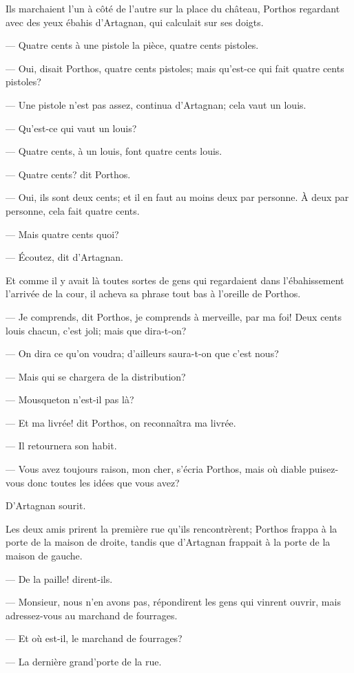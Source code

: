 Ils marchaient l'un à côté de l'autre sur la place du château, Porthos regardant avec des yeux ébahis d'Artagnan, qui calculait sur ses doigts.

— Quatre cents à une pistole la pièce, quatre cents pistoles.

— Oui, disait Porthos, quatre cents pistoles; mais qu'est-ce qui fait quatre cents pistoles?

— Une pistole n'est pas assez, continua d'Artagnan; cela vaut un louis.

— Qu'est-ce qui vaut un louis?

— Quatre cents, à un louis, font quatre cents louis.

— Quatre cents? dit Porthos.

— Oui, ils sont deux cents; et il en faut au moins deux par personne. À deux par personne, cela fait quatre cents.

— Mais quatre cents quoi?

— Écoutez, dit d'Artagnan.

Et comme il y avait là toutes sortes de gens qui regardaient dans l'ébahissement l'arrivée de la cour, il acheva sa phrase tout bas à l'oreille de Porthos.

— Je comprends, dit Porthos, je comprends à merveille, par ma foi! Deux cents louis chacun, c'est joli; mais que dira-t-on?

— On dira ce qu'on voudra; d'ailleurs saura-t-on que c'est nous?

— Mais qui se chargera de la distribution?

— Mousqueton n'est-il pas là?

— Et ma livrée! dit Porthos, on reconnaîtra ma livrée.

— Il retournera son habit.

— Vous avez toujours raison, mon cher, s'écria Porthos, mais où diable puisez-vous donc toutes les idées que vous avez?

D'Artagnan sourit.

Les deux amis prirent la première rue qu'ils rencontrèrent; Porthos frappa à la porte de la maison de droite, tandis que d'Artagnan frappait à la porte de la maison de gauche.

— De la paille! dirent-ils.

— Monsieur, nous n'en avons pas, répondirent les gens qui vinrent ouvrir, mais adressez-vous au marchand de fourrages.

— Et où est-il, le marchand de fourrages?

— La dernière grand'porte de la rue.

